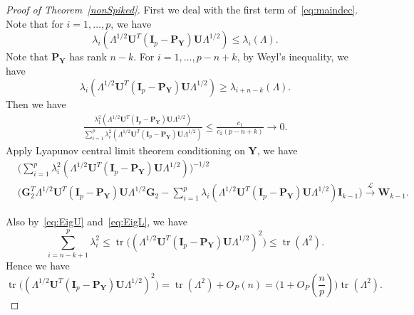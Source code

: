 \documentclass[12pt]{article} %
\DeclareMathOperator{\mytr}{tr}
\newcommand{\bP}{\mathbf{P}}
\newcommand{\bY}{\mathbf{Y}}
\newcommand{\bG}{\mathbf{G}}
\newcommand{\bI}{\mathbf{I}}
\newcommand{\bU}{\mathbf{U}}
\newcommand{\bW}{\mathbf{W}}
\theoremstyle{definition}
\begin{document}
\begin{proof}[\textrm{Proof of Theorem~\ref{nonSpiked}}]
    First we deal with the first term of~\eqref{eq:maindec}.
    Note that for $i=1,\ldots, p$, we have 
    \begin{equation}\label{eq:EigU}
    \lambda_i (\Lambda^{1/2}\bU^T (\bI_p-\bP_{\bY})\bU\Lambda^{1/2})\leq
    \lambda_i (\Lambda).
    \end{equation}
    Note that $\bP_{\bY}$ has rank $n-k$. For $i=1,\ldots, p-n+k$, by Weyl's inequality, we have
    \begin{equation}\label{eq:EigL}
    \lambda_i (\Lambda^{1/2}\bU^T (\bI_p-\bP_{\bY})\bU\Lambda^{1/2})\geq
    \lambda_{i+n-k} (\Lambda).
    \end{equation}
Then we have
    $$
    \begin{aligned}
        \frac{\lambda_1^2(\Lambda^{1/2}\bU^T(\bI_p-\bP_{\bY})\bU\Lambda^{1/2})}{\sum_{i=1}^p \lambda_i^2(\Lambda^{1/2}\bU^T(\bI_p-\bP_{\bY})\bU\Lambda^{1/2})}
    \leq
        \frac{c_1}{c_2(p-n+k)}\to 0.
    \end{aligned}
    $$
    Apply Lyapunov central limit theorem conditioning on $\bY$, we have
    $$
    \begin{aligned}
        &\Big( \sum_{i=1}^p \lambda_i^2(\Lambda^{1/2}\bU^T(\bI_p-\bP_{\bY})\bU\Lambda^{1/2})\Big)^{-1/2}\\
        &{\Big( \bG_2^T \Lambda^{1/2}\bU^T (\bI_p-\bP_{\bY})\bU\Lambda^{1/2}\bG_2-\sum_{i=1}^p \lambda_i(\Lambda^{1/2}\bU^T(\bI_p-\bP_{\bY})\bU\Lambda^{1/2})\bI_{k-1}\Big)}
    \xrightarrow{\mathcal{L}} \bW_{k-1}.
    \end{aligned}
    $$

    Also by~\eqref{eq:EigU} and~\eqref{eq:EigL}, we have
    $$
    \sum_{i=n-k+1}^p \lambda_i^2
    \leq
    \mytr\Big((\Lambda^{1/2}\bU^T (\bI_p-\bP_{\bY})\bU\Lambda^{1/2})^2\Big)\leq
    \mytr(\Lambda^2).
    $$ 
    Hence we have
    $$
    \mytr\Big((\Lambda^{1/2}\bU^T (\bI_p-\bP_{\bY})\bU\Lambda^{1/2})^2\Big)
    =
    \mytr(\Lambda^2)+O_P(n)
    =
    \big(1+O_P(\frac{n}{p})\big)\mytr(\Lambda^2).
    $$ 


\end{proof}
\end{document}
